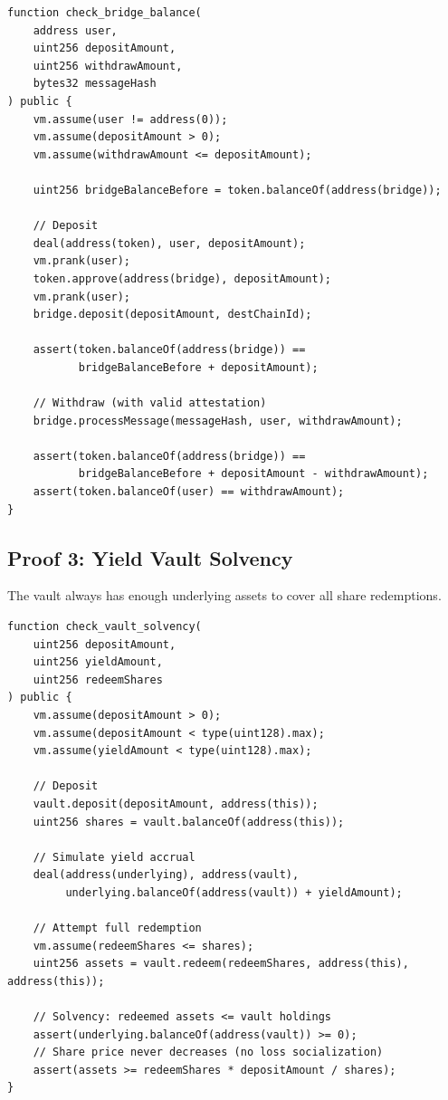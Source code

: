 \documentclass[11pt,a4paper]{article}
\begin{document}
\begin{lstlisting}[language=Solidity,caption={Bridge balance proof}]
function check_bridge_balance(
    address user,
    uint256 depositAmount,
    uint256 withdrawAmount,
    bytes32 messageHash
) public {
    vm.assume(user != address(0));
    vm.assume(depositAmount > 0);
    vm.assume(withdrawAmount <= depositAmount);

    uint256 bridgeBalanceBefore = token.balanceOf(address(bridge));

    // Deposit
    deal(address(token), user, depositAmount);
    vm.prank(user);
    token.approve(address(bridge), depositAmount);
    vm.prank(user);
    bridge.deposit(depositAmount, destChainId);

    assert(token.balanceOf(address(bridge)) ==
           bridgeBalanceBefore + depositAmount);

    // Withdraw (with valid attestation)
    bridge.processMessage(messageHash, user, withdrawAmount);

    assert(token.balanceOf(address(bridge)) ==
           bridgeBalanceBefore + depositAmount - withdrawAmount);
    assert(token.balanceOf(user) == withdrawAmount);
}
\end{lstlisting}

\subsection{Proof 3: Yield Vault Solvency}

The vault always has enough underlying assets to cover all share redemptions.

\begin{lstlisting}[language=Solidity,caption={Yield vault solvency proof}]
function check_vault_solvency(
    uint256 depositAmount,
    uint256 yieldAmount,
    uint256 redeemShares
) public {
    vm.assume(depositAmount > 0);
    vm.assume(depositAmount < type(uint128).max);
    vm.assume(yieldAmount < type(uint128).max);

    // Deposit
    vault.deposit(depositAmount, address(this));
    uint256 shares = vault.balanceOf(address(this));

    // Simulate yield accrual
    deal(address(underlying), address(vault),
         underlying.balanceOf(address(vault)) + yieldAmount);

    // Attempt full redemption
    vm.assume(redeemShares <= shares);
    uint256 assets = vault.redeem(redeemShares, address(this), address(this));

    // Solvency: redeemed assets <= vault holdings
    assert(underlying.balanceOf(address(vault)) >= 0);
    // Share price never decreases (no loss socialization)
    assert(assets >= redeemShares * depositAmount / shares);
}
\end{lstlisting}
\end{document}
